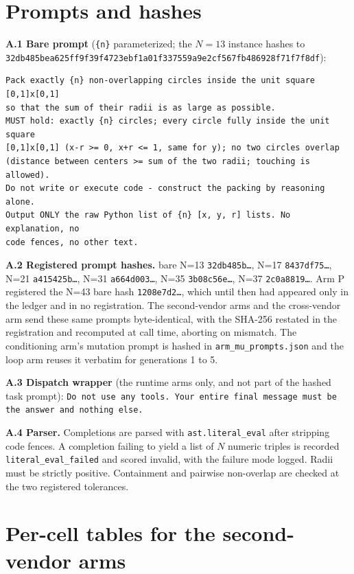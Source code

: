 

\section{Prompts and hashes}\label{supp:prompts}

\textbf{A.1 Bare prompt} (\texttt{\{n\}} parameterized; the $N = 13$ instance hashes to
\texttt{32db485bea\bk{}625ff9f39f\bk{}4723ebf1a0\bk{}1f337559a9\bk{}e2cf567fb4\bk{}86928f71f7\bk{}f8df}):

\begin{verbatim}
Pack exactly {n} non-overlapping circles inside the unit square [0,1]x[0,1]
so that the sum of their radii is as large as possible.
MUST hold: exactly {n} circles; every circle fully inside the unit square
[0,1]x[0,1] (x-r >= 0, x+r <= 1, same for y); no two circles overlap
(distance between centers >= sum of the two radii; touching is allowed).
Do not write or execute code - construct the packing by reasoning alone.
Output ONLY the raw Python list of {n} [x, y, r] lists. No explanation, no
code fences, no other text.
\end{verbatim}

\textbf{A.2 Registered prompt hashes.} bare N=13 \texttt{32db485b\ldots}, N=17
\texttt{8437df75\ldots}, N=21 \texttt{a415425b\ldots}, N=31 \texttt{a664d003\ldots}, N=35
\texttt{3b08c56e\ldots}, N=37 \texttt{2c0a8819\ldots}. Arm P registered the N=43 bare hash
\texttt{1208e7d2\ldots}, which until then had appeared only in the ledger and in no
registration. The second-vendor arms and the
cross-vendor arm send these same prompts byte-identical, with the SHA-256 restated in the
registration and recomputed at call time, aborting on mismatch. The conditioning arm's
mutation prompt is hashed in \texttt{arm\_mu\_prompts.json} and the loop arm reuses it
verbatim for generations 1 to 5.

\textbf{A.3 Dispatch wrapper} (the runtime arms only, and not part of the hashed task prompt):
\texttt{Do not use any tools. Your entire final message must be the answer and nothing else.}

\textbf{A.4 Parser.} Completions are parsed with \texttt{ast.literal\_eval} after stripping
code fences. A completion failing to yield a list of $N$ numeric triples is recorded
\texttt{literal\_eval\_failed} and scored invalid, with the failure mode logged. Radii must be
strictly positive. Containment and pairwise non-overlap are checked at the two registered
tolerances.

\section{Per-cell tables for the second-vendor arms}\label{supp:vendors}

